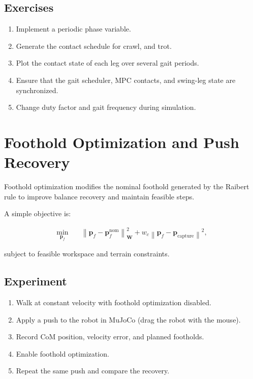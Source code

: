 \documentclass[11pt,a4paper]{article}
\begin{document}
\subsection*{Exercises}

\begin{enumerate}[label=\arabic*.]
	\item Implement a periodic phase variable.
	\item Generate the contact schedule for crawl,  and trot.
	\item Plot the contact state of each leg over several gait periods.
	\item Ensure that the gait scheduler, MPC contacts, and swing-leg state are synchronized.
	\item Change duty factor and gait frequency during simulation.
\end{enumerate}

\section{Foothold Optimization and Push Recovery}

Foothold optimization modifies the nominal foothold generated by the Raibert rule to improve balance recovery and maintain feasible steps.

A simple objective is:

\begin{align*}
	\min_{\bm{p}_f}
	\quad &
	\left\|
	\bm{p}_f-\bm{p}_f^{\mathrm{nom}}
	\right\|_{\bm{W}}^2
	+
	w_c
	\left\|
	\bm{p}_f-\bm{p}_{\mathrm{capture}}
	\right\|^2,
\end{align*}

subject to feasible workspace and terrain constraints.

\subsection*{Experiment}

\begin{enumerate}[label=\arabic*.]
	\item Walk at constant velocity with foothold optimization disabled.
	\item Apply a push to the robot in MuJoCo (drag the robot with the mouse).
	\item Record CoM position, velocity error, and planned footholds.
	\item Enable foothold optimization.
	\item Repeat the same push and compare the recovery.
\end{enumerate}
\end{document}
